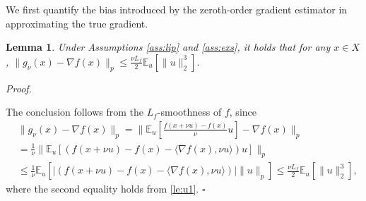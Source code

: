 \documentclass[11pt]{article}
\newtheorem{lemma}{Lemma}[section]
\newenvironment{proof}[1][Proof]{%
    \par\noindent\textit{#1.}\enspace
  }{%
    \hfill\ensuremath{\square}\par
  }%
\numberwithin{equation}{section}
\newcommand{\E}{\mathbb{E}}
\begin{document}
We first quantify the bias introduced by the zeroth-order gradient estimator in approximating the true gradient.
\begin{lemma}\label{le:vg}
    Under Assumptions \ref{ass:lip} and  \ref{ass:exs}, it holds that for any $x \in X$, 
    \(
        \|g_\nu(x) - \nabla f(x)\|_p \leq \frac{\nu L_f}{2} \E_u [\|u\|_2^3].
    \)
\end{lemma}
\begin{proof} 
The conclusion follows from the \(L_f\)-smoothness of \(f\), since
        \begin{align*}
           & \|g_\nu(x) - \nabla f(x)\|_p = \|\E_u [\frac{f(x+\nu u)-f(x)}{\nu} u] - \nabla f(x)\|_p \\
            & = \frac{1}{\nu}\|\E_u [(f(x+\nu u)-f(x)- \langle \nabla f(x),\nu u\rangle) u] \|_p\\
            & \leq \frac{1}{\nu} \E_u [|(f(x+\nu u)-f(x)- \langle \nabla f(x),\nu u\rangle)| \| u\|_p]  \leq \frac{\nu L_f}{2} \E_u [\|u\|_2^3],
        \end{align*}
    where the second equality holds from \eqref{le:u1}.
\end{proof}
\end{document}

